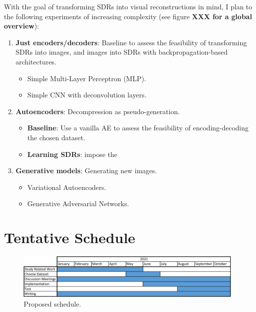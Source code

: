 \documentclass{article}
\begin{document}
With the goal of transforming SDRs into visual reconstructions in mind, I plan to the following experiments of increasing complexity (see figure \textbf{XXX for a global overview}):
\begin{enumerate}
    \item \textbf{Just encoders/decoders}: Baseline to assess the feasibility of transforming SDRs into images, and images into SDRs with backpropagation-based architectures.
    \begin{itemize}
        \item Simple Multi-Layer Perceptron (MLP).
        \item Simple CNN with deconvolution layers.
    \end{itemize}
    \item \textbf{Autoencoders}: Decompression as pseudo-generation.
    \begin{itemize}
        \item \textbf{Baseline}: Use a vanilla AE to assess the feasibility of encoding-decoding the chosen dataset.
        \item \textbf{Learning SDRs}: impose the 
    \end{itemize}
    \item \textbf{Generative models}: Generating new images.
    \begin{itemize}
        \item Variational Autoencoders.
        \item Generative Adversarial Networks.
    \end{itemize}
\end{enumerate}

\section{Tentative Schedule}
\begin{figure}[h]
    \centering
    \includegraphics[width=0.99\textwidth]{introduction/img/schedule.png}
    \caption{Proposed schedule.}
\label{fig:schedule}
\end{figure}



 
\end{document}
